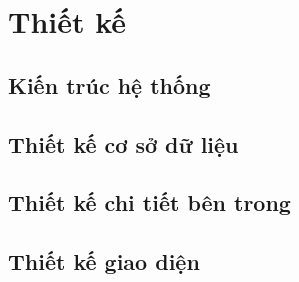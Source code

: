\section{Thiết kế}

% 

\subsection{Kiến trúc hệ thống}


\subsection{Thiết kế cơ sở dữ liệu}

\subsection{Thiết kế chi tiết bên trong}

\subsection{Thiết kế giao diện}
% 
